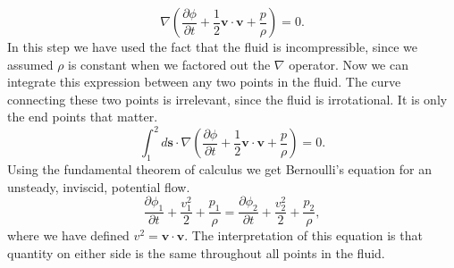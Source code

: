 \documentclass[12pt, letter]{report}
\begin{document}
\begin{equation}
\nabla \left( \frac{\partial  \phi}{\partial t} +  \frac{1}{2}  \textbf{v} \cdot \textbf{v} + \frac{p}{\rho} \right) = 0.
\end{equation}
In this step we have used the fact that the fluid is incompressible, since we assumed $\rho$ is constant when we factored out the $\nabla$ operator. Now we can integrate this expression between any two points in the fluid. The curve connecting these two points is irrelevant, since the fluid is irrotational. It is only the end points that matter.
\begin{equation}
\int_1^2 d\textbf{s} \cdot \nabla \left( \frac{\partial  \phi}{\partial t} +  \frac{1}{2}  \textbf{v} \cdot \textbf{v} + \frac{p}{\rho} \right) = 0.
\end{equation}
Using the fundamental theorem of calculus we get Bernoulli's equation for an unsteady, inviscid, potential flow.
\begin{equation}
\frac{\partial  \phi_1}{\partial t} +  \frac{v_1^2}{2} + \frac{p_1}{\rho}=\frac{\partial  \phi_2}{\partial t} +  \frac{v_2^2}{2} + \frac{p_2}{\rho},
\end{equation}
where we have defined $v^2 = \textbf{v} \cdot \textbf{v}$. The interpretation of this equation is that quantity on either side is the same throughout all points in the fluid.
\end{document}
